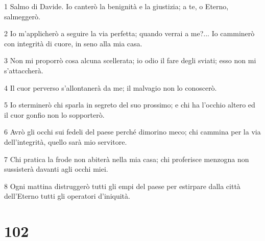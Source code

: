 \par 1 Salmo di Davide. Io canterò la benignità e la giustizia; a te, o Eterno, salmeggerò.
\par 2 Io m'applicherò a seguire la via perfetta; quando verrai a me?... Io camminerò con integrità di cuore, in seno alla mia casa.
\par 3 Non mi proporrò cosa alcuna scellerata; io odio il fare degli sviati; esso non mi s'attaccherà.
\par 4 Il cuor perverso s'allontanerà da me; il malvagio non lo conoscerò.
\par 5 Io sterminerò chi sparla in segreto del suo prossimo; e chi ha l'occhio altero ed il cuor gonfio non lo sopporterò.
\par 6 Avrò gli occhi sui fedeli del paese perché dimorino meco; chi cammina per la via dell'integrità, quello sarà mio servitore.
\par 7 Chi pratica la frode non abiterà nella mia casa; chi proferisce menzogna non sussisterà davanti agli occhi miei.
\par 8 Ogni mattina distruggerò tutti gli empi del paese per estirpare dalla città dell'Eterno tutti gli operatori d'iniquità.

\chapter{102}

